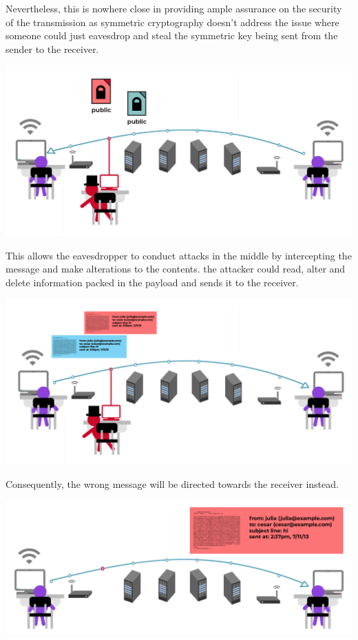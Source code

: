 \documentclass[12pt]{article}
\begin{document}
Nevertheless, this is nowhere close in providing ample assurance on the security of the transmission as symmetric cryptography doesn't address the issue where someone could just eavesdrop and steal the symmetric key being sent from the sender to the receiver. \\

\begin{center}
\includegraphics[scale=0.5]{midatk}
\end{center}

This allows the eavesdropper to conduct attacks in the middle by intercepting the message and make alterations to the contents. the attacker could read, alter and delete information packed in the payload and sends it to the receiver. \\
 
\begin{center}
\includegraphics[scale=0.5]{messing}
\end{center}

Consequently, the wrong message will be directed towards the receiver instead. \\

\begin{center}
\includegraphics[scale=0.5]{wrong}
\end{center}
\end{document}
